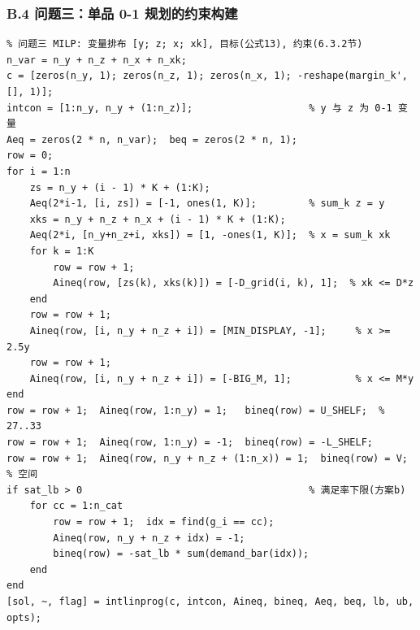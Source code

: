 \subsubsection{B.4 问题三：单品 0-1 规划的约束构建}

{\footnotesize
\begin{verbatim}
% 问题三 MILP: 变量排布 [y; z; x; xk], 目标(公式13), 约束(6.3.2节)
n_var = n_y + n_z + n_x + n_xk;
c = [zeros(n_y, 1); zeros(n_z, 1); zeros(n_x, 1); -reshape(margin_k', [], 1)];
intcon = [1:n_y, n_y + (1:n_z)];                    % y 与 z 为 0-1 变量
Aeq = zeros(2 * n, n_var);  beq = zeros(2 * n, 1);
row = 0;
for i = 1:n
    zs = n_y + (i - 1) * K + (1:K);
    Aeq(2*i-1, [i, zs]) = [-1, ones(1, K)];         % sum_k z = y
    xks = n_y + n_z + n_x + (i - 1) * K + (1:K);
    Aeq(2*i, [n_y+n_z+i, xks]) = [1, -ones(1, K)];  % x = sum_k xk
    for k = 1:K
        row = row + 1;
        Aineq(row, [zs(k), xks(k)]) = [-D_grid(i, k), 1];  % xk <= D*z
    end
    row = row + 1;
    Aineq(row, [i, n_y + n_z + i]) = [MIN_DISPLAY, -1];     % x >= 2.5y
    row = row + 1;
    Aineq(row, [i, n_y + n_z + i]) = [-BIG_M, 1];           % x <= M*y
end
row = row + 1;  Aineq(row, 1:n_y) = 1;   bineq(row) = U_SHELF;  % 27..33
row = row + 1;  Aineq(row, 1:n_y) = -1;  bineq(row) = -L_SHELF;
row = row + 1;  Aineq(row, n_y + n_z + (1:n_x)) = 1;  bineq(row) = V; % 空间
if sat_lb > 0                                       % 满足率下限(方案b)
    for cc = 1:n_cat
        row = row + 1;  idx = find(g_i == cc);
        Aineq(row, n_y + n_z + idx) = -1;
        bineq(row) = -sat_lb * sum(demand_bar(idx));
    end
end
[sol, ~, flag] = intlinprog(c, intcon, Aineq, bineq, Aeq, beq, lb, ub, opts);
\end{verbatim}
}

